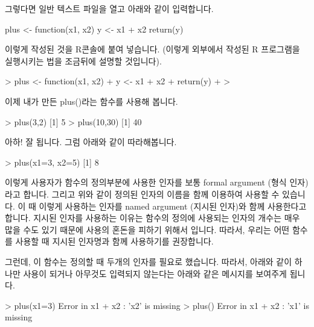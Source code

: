\documentclass{book}
\begin{document}
그렇다면 일반 텍스트 파일을 열고 아래와 같이 입력합니다. 

\begin{Schunk}
\begin{Soutput}
plus <- function(x1, x2){
	y <- x1 + x2
	return(y)
}
\end{Soutput}
\end{Schunk}

이렇게 작성된 것을 R콘솔에 붙여 넣습니다.  
(이렇게 외부에서 작성된 R 프로그램을 실행시키는 법을 조금뒤에 설명할 것입니다).

\begin{Schunk}
\begin{Soutput}
> plus <- function(x1, x2){
+ y <- x1 + x2
+ return(y)
+ }
>
\end{Soutput}
\end{Schunk}

이제 내가 만든 plus()라는 함수를 사용해 봅니다. 

\begin{Schunk}
\begin{Soutput}
> plus(3,2)
[1] 5
> plus(10,30)
[1] 40
\end{Soutput}
\end{Schunk}

아하! 잘 됩니다. 
그럼 아래와 같이 따라해봅니다. 
\begin{Schunk}
\begin{Soutput}
> plus(x1=3, x2=5)
[1] 8
\end{Soutput}
\end{Schunk}

이렇게 사용자가 함수의 정의부분에 사용한 인자를 보통 formal argument (형식 인자)라고 합니다. 
그리고 위와 같이 정의된 인자의 이름을 함께 이용하여 사용할 수 있습니다. 
이 때 이렇게 사용하는 인자를  named argument (지시된 인자)와 함께 사용한다고 합니다. 
지시된 인자를 사용하는 이유는 함수의 정의에 사용되는 인자의 개수는 매우 많을 수도 있기 때문에 사용의 혼돈을 피하기 위해서 입니다. 
따라서, 우리는 어떤 함수를 사용할 때 지시된 인자명과 함께 사용하기를 권장합니다. 

그런데, 이 함수는 정의할 때 두개의 인자를 필요로 했습니다. 
따라서, 아래와 같이 하나만 사용이 되거나 아무것도 입력되지 않는다는 아래와 같은 메시지를 보여주게 됩니다. 

\begin{Schunk}
\begin{Soutput}
> plus(x1=3)
Error in x1 + x2 : 'x2' is missing
> plus()
Error in x1 + x2 : 'x1' is missing
\end{Soutput}
\end{Schunk}
\end{document}
